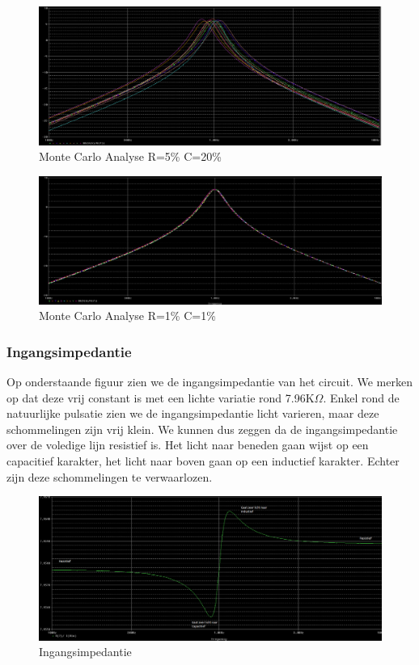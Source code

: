 \documentclass[]{article}
\begin{document}
\begin{figure}[H]
	\centering
	\includegraphics[width=13cm]{mc_transfer_smal}
	\caption{Monte Carlo Analyse R=5\% C=20\%}
	\label{fig:mc_transfer_smal}
\end{figure}

\begin{figure}[H]
	\centering
	\includegraphics[width=13cm]{mc1}
	\caption{Monte Carlo Analyse R=1\% C=1\%}
	\label{fig:mc_transfer}
\end{figure}

\newpage

\subsubsection*{Ingangsimpedantie}

Op onderstaande figuur zien we de ingangsimpedantie van het circuit. We merken op dat deze vrij constant is met een lichte variatie rond 7.96K$\Omega$. Enkel rond de natuurlijke pulsatie zien we de ingangsimpedantie licht varieren, maar deze schommelingen zijn vrij klein. We kunnen dus zeggen da de ingangsimpedantie over de voledige lijn resistief is. Het licht naar beneden gaan wijst op een capacitief karakter, het licht naar boven gaan op een inductief karakter. Echter zijn deze schommelingen te verwaarlozen. 

\begin{figure}[H]
	\centering
	\includegraphics[width=13cm]{ingangsimp}
	\caption{Ingangsimpedantie}
	\label{fig:ingangsimp}
\end{figure}
\end{document}
